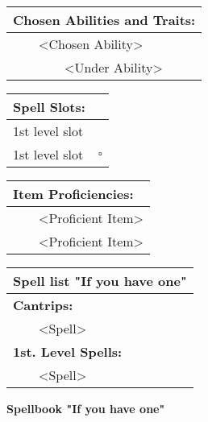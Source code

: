 \documentclass[11pt]{article}
\newcommand{\done}{\rlap{$\square$}{\raisebox{2pt}{\large\hspace{1pt}\ding{51}}}}
\newcommand{\available}{$\square$}
\newcommand{\tabitem}{~~\llap{--}~~}
\newcommand{\tabtabitem}{~~~~~~\llap{$\bullet$}~~}
\begin{document}
\begin{multicols}{2}
\vspace{4mm}

\noindent \begin{tabularx}{\linewidth}{@{}l}
{\Large \textbf{Chosen Abilities and Traits:}} \\
\hline
\tabitem <Chosen Ability> \\
\tabtabitem <Under Ability>
		\end{tabularx}

\vspace{4mm}

\noindent \begin{tabularx}{\linewidth}{@{}l c}
{\Large \textbf{Spell Slots:}} \\
\hline
1st level slot & \done \\
1st level slot & \available
		\end{tabularx}

\vspace{4mm}

\noindent \begin{tabularx}{\linewidth}{@{}l}
{\Large \textbf{Item Proficiencies:}} \\
\hline
\tabitem <Proficient Item> \\
\tabitem <Proficient Item>
		\end{tabularx}

\vspace{4mm}

\noindent \begin{tabularx}{\linewidth}{@{}l}
{\Large \textbf{Spell list "If you have one"}} 			\\
\hline
\textbf{Cantrips:}	 					\\
\tabitem <Spell>						\\

\textbf{1st. Level Spells:}				\\
\tabitem <Spell>
		\end{tabularx}
	\end{multicols}

\clearpage

	\begin{center}
{\LARGE \textbf{Spellbook "If you have one"}}
	\end{center}
\end{document}
